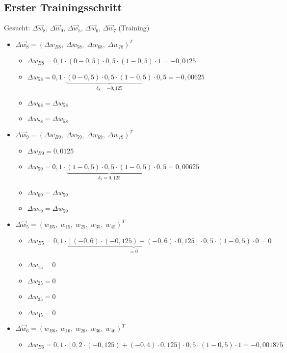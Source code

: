 \subsection{Erster Trainingsschritt}
Gesucht: $\Delta \vec{w}_8$, $\Delta\vec{w}_9$, $\Delta\vec{w}_5$, $\Delta\vec{w}_6$, $\Delta\vec{w}_7$ (Training)
\begin{itemize}
\item $\Delta \vec{w}_8 = (\Delta w_{B8},\; \Delta w_{58},\; \Delta w_{68},\; \Delta w_{78})^T$
\begin{itemize}
\item $\Delta w_{B8} = 0,1 \cdot (0-0,5) \cdot 0,5 \cdot (1-0,5) \cdot 1 = -0,0125$
\item $\Delta w_{58} = 0,1 \cdot \underbrace{(0-0,5)\cdot 0,5\cdot (1-0,5)}_{\delta_8=-0,125} \cdot 0,5 = -0,00625$
\item $\Delta w_{68} = \Delta w_{58}$
\item $\Delta w_{78} = \Delta w_{58}$
\end{itemize}
\item $\Delta \vec{w}_9 = (\Delta w_{B9},\; \Delta w_{59},\; \Delta w_{69},\; \Delta w_{79})^T$
\begin{itemize}
\item $\Delta w_{B9} = 0,0125$
\item $\Delta w_{59} = 0,1 \cdot \underbrace{(1-0,5) \cdot 0,5 \cdot (1-0,5)}_{\delta_9=0,125} \cdot 0,5 = 0,00625$
\item $\Delta w_{69} = \Delta w_{59}$
\item $\Delta w_{79} = \Delta w_{59}$
\end{itemize}
\item $\Delta \vec{w}_5 = (w_{B5},\; w_{15},\; w_{25},\; w_{35},\; w_{45})^T$
\begin{itemize}
\item $\Delta w_{B5} = 0,1 \cdot \underbrace{[(-0,6) \cdot (-0,125) + (-0,6) \cdot 0,125]}_{=0}\cdot 0,5 \cdot (1-0,5) \cdot 0 = 0$
\item $\Delta w_{15} = 0$
\item $\Delta w_{25} = 0$
\item $\Delta w_{35} = 0$
\item $\Delta w_{45} = 0$
\end{itemize}
\item $\Delta \vec{w}_6 = (w_{B6},\; w_{16},\; w_{26},\; w_{36},\; w_{46})^T$
\begin{itemize}
\item $\Delta w_{B6} = 0,1 \cdot [0,2 \cdot (-0,125) + (-0,4) \cdot 0,125]\cdot 0,5 \cdot (1-0,5) \cdot 1 = -0,001875$

\end{itemize}
\end{itemize}
